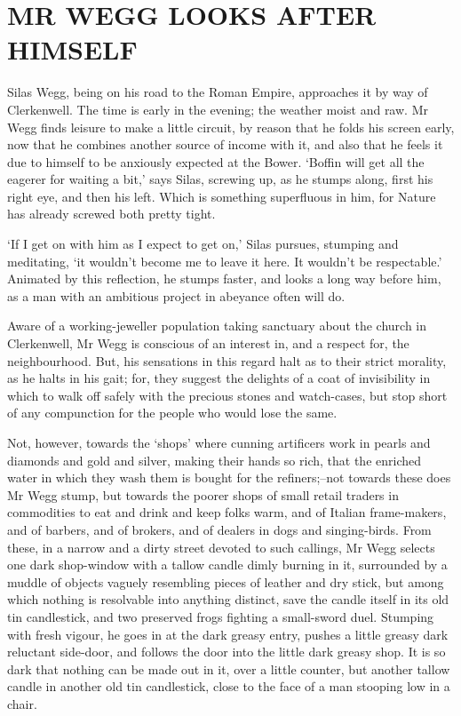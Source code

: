 
\chapter{MR WEGG LOOKS AFTER HIMSELF}

Silas Wegg, being on his road to the Roman Empire, approaches it by way
of Clerkenwell. The time is early in the evening; the weather moist and
raw. Mr Wegg finds leisure to make a little circuit, by reason that he
folds his screen early, now that he combines another source of income
with it, and also that he feels it due to himself to be anxiously
expected at the Bower. ‘Boffin will get all the eagerer for waiting a
bit,’ says Silas, screwing up, as he stumps along, first his right eye,
and then his left. Which is something superfluous in him, for Nature has
already screwed both pretty tight.

‘If I get on with him as I expect to get on,’ Silas pursues, stumping
and meditating, ‘it wouldn’t become me to leave it here. It wouldn’t be
respectable.’ Animated by this reflection, he stumps faster, and looks
a long way before him, as a man with an ambitious project in abeyance
often will do.

Aware of a working-jeweller population taking sanctuary about the church
in Clerkenwell, Mr Wegg is conscious of an interest in, and a respect
for, the neighbourhood. But, his sensations in this regard halt as to
their strict morality, as he halts in his gait; for, they suggest the
delights of a coat of invisibility in which to walk off safely with the
precious stones and watch-cases, but stop short of any compunction for
the people who would lose the same.

Not, however, towards the ‘shops’ where cunning artificers work in
pearls and diamonds and gold and silver, making their hands so rich,
that the enriched water in which they wash them is bought for the
refiners;--not towards these does Mr Wegg stump, but towards the poorer
shops of small retail traders in commodities to eat and drink and keep
folks warm, and of Italian frame-makers, and of barbers, and of brokers,
and of dealers in dogs and singing-birds. From these, in a narrow and
a dirty street devoted to such callings, Mr Wegg selects one dark
shop-window with a tallow candle dimly burning in it, surrounded by a
muddle of objects vaguely resembling pieces of leather and dry stick,
but among which nothing is resolvable into anything distinct, save
the candle itself in its old tin candlestick, and two preserved frogs
fighting a small-sword duel. Stumping with fresh vigour, he goes in at
the dark greasy entry, pushes a little greasy dark reluctant side-door,
and follows the door into the little dark greasy shop. It is so dark
that nothing can be made out in it, over a little counter, but another
tallow candle in another old tin candlestick, close to the face of a man
stooping low in a chair.

